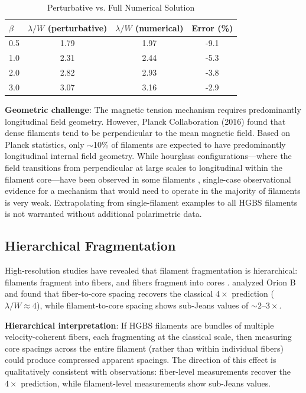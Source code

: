 \documentclass[twoside,twocolumn]{mnras}
\begin{document}
\begin{table}
\caption{Perturbative vs. Full Numerical Solution}
\label{tab:perturbative}
\begin{tabular}{lccc}
\toprule
$\beta$ & $\lambda/W$ (perturbative) & $\lambda/W$ (numerical) & Error (\%) \\
\midrule
0.5 & 1.79 & 1.97 & -9.1 \\
1.0 & 2.31 & 2.44 & -5.3 \\
2.0 & 2.82 & 2.93 & -3.8 \\
3.0 & 3.07 & 3.16 & -2.9 \\
\bottomrule
\end{tabular}
\end{table}

\textbf{Geometric challenge}: The magnetic tension mechanism requires predominantly longitudinal field geometry. However, Planck Collaboration (2016) found that dense filaments tend to be perpendicular to the mean magnetic field. Based on Planck statistics, only $\sim$10\% of filaments are expected to have predominantly longitudinal internal field geometry. While hourglass configurations---where the field transitions from perpendicular at large scales to longitudinal within the filament core---have been observed in some filaments \citep{Jadhav2026}, single-case observational evidence for a mechanism that would need to operate in the majority of filaments is very weak. Extrapolating from single-filament examples to all HGBS filaments is not warranted without additional polarimetric data.

\subsection{Hierarchical Fragmentation}

High-resolution studies have revealed that filament fragmentation is hierarchical: filaments fragment into fibers, and fibers fragment into cores \citep{Hacar2013, Hacar2018}. \citet{Yang2024} analyzed Orion B and found that fiber-to-core spacing recovers the classical $4\times$ prediction ($\lambda/W \approx 4$), while filament-to-core spacing shows sub-Jeans values of $\sim2$--$3\times$.

\textbf{Hierarchical interpretation}: If HGBS filaments are bundles of multiple velocity-coherent fibers, each fragmenting at the classical scale, then measuring core spacings across the entire filament (rather than within individual fibers) could produce compressed apparent spacings. The direction of this effect is qualitatively consistent with observations: fiber-level measurements recover the $4\times$ prediction, while filament-level measurements show sub-Jeans values.
\end{document}
